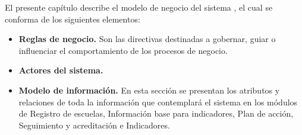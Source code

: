 
El presente capítulo describe el modelo de negocio del sistema , el cual se conforma de los siguientes elementos:

\begin{itemize}
	
	\item \textbf{Reglas de negocio.} Son las directivas destinadas a gobernar, guiar o influenciar el comportamiento de los procesos de negocio.
	
	\item \textbf{Actores del sistema.}
	
    \item \textbf{Modelo de información.} En esta sección se presentan los atributos y relaciones de toda la información que contemplará el sistema en los módulos de Registro de escuelas, Información base para indicadores, Plan de acción, Seguimiento y acreditación e Indicadores.


\end{itemize}

